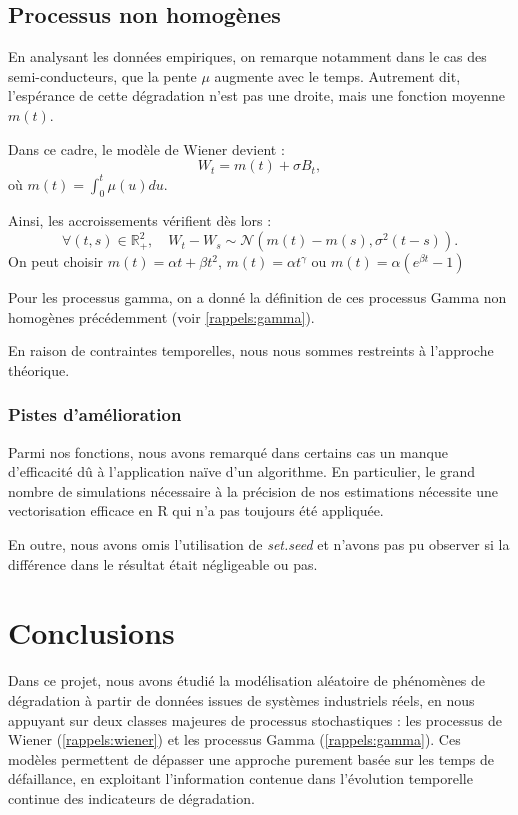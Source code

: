 \documentclass[11pt,a4paper]{article}
\begin{document}
\subsection{Processus non homogènes} \label{approfondissements:nonhomo}
En analysant les données empiriques, on remarque notamment dans le cas des semi-conducteurs, que la pente $\mu$ augmente avec le temps. Autrement dit, l'espérance de cette dégradation n'est pas une droite, mais une fonction moyenne $m(t)$.

Dans ce cadre, le modèle de Wiener devient : $$
W_t = m(t) + \sigma B_t,
$$
où $m(t) = \int_{0}^{t} \mu(u)du$.

Ainsi, les accroissements vérifient dès lors : $$
\forall (t, s) \in \mathbb{R}_+^2, \quad W_t - W_s \sim \mathcal{N}(m(t)-m(s),\sigma^2 (t-s)).
$$
On peut choisir $m(t) = \alpha t + \beta t^2$, $m(t) = \alpha t^\gamma$ ou $m(t) = \alpha (e^{\beta t} -1)$


Pour les processus gamma, on a donné la définition de ces processus Gamma non homogènes précédemment (voir \ref{rappels:gamma}).

En raison de contraintes temporelles, nous nous sommes restreints à l'approche théorique.

\subsubsection{Pistes d'amélioration}
Parmi nos fonctions, nous avons remarqué dans certains cas un manque d'efficacité dû à l'application naïve d'un algorithme. En particulier, le grand nombre de simulations nécessaire à la précision de nos estimations nécessite une vectorisation efficace en R qui n'a pas toujours été appliquée.

En outre, nous avons omis l'utilisation de \textit{set.seed} et n'avons pas pu observer si la différence dans le résultat était négligeable ou pas.

\section{Conclusions}\label{conclusions}

Dans ce projet, nous avons étudié la modélisation aléatoire de phénomènes de dégradation à partir de données issues de systèmes industriels réels, en nous appuyant sur deux classes majeures de processus stochastiques : les processus de Wiener (\ref{rappels:wiener}) et les processus Gamma (\ref{rappels:gamma}). Ces modèles permettent de dépasser une approche purement basée sur les temps de défaillance, en exploitant l’information contenue dans l’évolution temporelle continue des indicateurs de dégradation.
\end{document}
